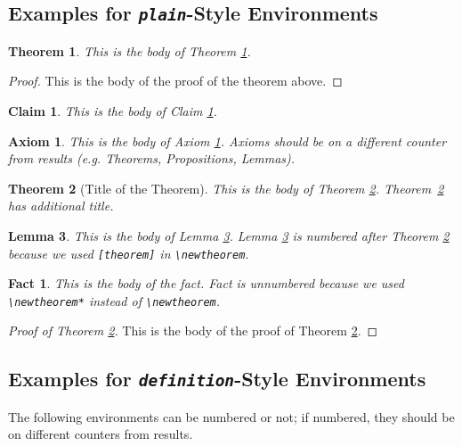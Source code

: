 \documentclass[ecta,nameyear,draft]{econsocart}
\theoremstyle{plain}
\newtheorem{axiom}{Axiom}
\newtheorem{theorem}{Theorem}
\newtheorem{claim}{Claim}
\newtheorem{lemma}[theorem]{Lemma}
\newtheorem*{fact}{Fact}
\theoremstyle{definition}
\begin{document}
\subsection{Examples for \emph{\texttt{plain}}-Style Environments}

\begin{theorem}\label{th1}
This is the body of Theorem \ref{th1}.
\end{theorem}


\begin{proof}
This is the body of the proof of the theorem above.
\end{proof}

\begin{claim}\label{cl1}
This is the body of Claim \ref{cl1}. 
\end{claim}



\begin{axiom}\label{ax1}
This is the body of Axiom \ref{ax1}. Axioms should be on a different counter from results (e.g. Theorems, Propositions, Lemmas).
\end{axiom}

\begin{theorem}[Title of the Theorem]\label{th2}
This is the body of Theorem \ref{th2}. Theorem~\ref{th2} has additional title.
\end{theorem}

\begin{lemma}\label{le1}
This is the body of Lemma \ref{le1}. Lemma \ref{le1} is numbered after
Theorem \ref{th2} because we used \verb|[theorem]| in \verb|\newtheorem|.
\end{lemma}

\begin{fact}
This is the body of the fact. Fact is unnumbered because we used \verb|\newtheorem*|
instead of \verb|\newtheorem|.
\end{fact}

\begin{proof}[Proof of Theorem \ref{th2}]
This is the body of the proof of Theorem \ref{th2}.
\end{proof}


\subsection{Examples for \emph{\texttt{definition}}-Style Environments}


The following environments can be numbered or not; if numbered, they should be on different counters from results.
\end{document}
